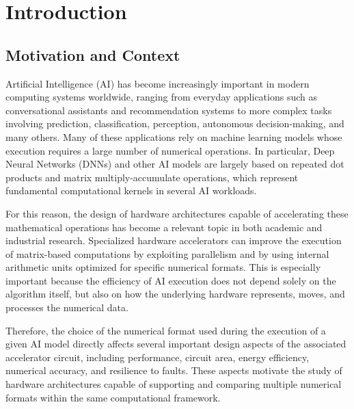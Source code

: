 
\chapter{Introduction}



\section{Motivation and Context}

Artificial Intelligence (AI) has become increasingly important in modern
computing systems worldwide, ranging from everyday applications such as
conversational assistants and recommendation systems to more complex tasks
involving prediction, classification, perception, autonomous decision-making,
and many others. Many of these applications rely on machine learning models
whose execution requires a large number of numerical operations. In particular,
Deep Neural Networks (DNNs) and other AI models are largely based on repeated
dot products and matrix multiply-accumulate operations, which represent
fundamental computational kernels in several AI workloads.

For this reason, the design of hardware architectures capable of accelerating
these mathematical operations has become a relevant topic in both academic and
industrial research. Specialized hardware accelerators can improve the execution
of matrix-based computations by exploiting parallelism and by using internal
arithmetic units optimized for specific numerical formats. This is especially
important because the efficiency of AI execution does not depend solely on the
algorithm itself, but also on how the underlying hardware represents, moves, and
processes the numerical data.

Therefore, the choice of the numerical format used during the execution of a
given AI model directly affects several important design aspects of the
associated accelerator circuit, including performance, circuit area, energy
efficiency, numerical accuracy, and resilience to faults. These aspects motivate
the study of hardware architectures capable of supporting and comparing multiple
numerical formats within the same computational framework.


